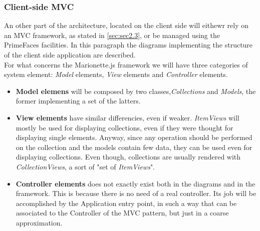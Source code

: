 \subsubsection{Client-side MVC}
An other part of the architecture, located on the client side will eithewr rely on an MVC framework, as stated in \autoref{sec:sec2.3}, or be managed using the PrimeFaces facilities.
In this paragraph the diagrams implementing the structure of the client side application are described.\\
For what concerns the Marionette.js framework we will have three categories of system element: \textit{Model} elements, \textit{View} elements and \textit{Controller} elements.
\begin{itemize}
\item \textbf{Model elemens} will be composed by two classes,\textit{Collections} and \textit{Models}, the former implementing a set of the latters.
\item \textbf{View elements} have similar differencies, even if weaker. \textit{ItemViews} will mostly be used for displaying collections, even if they were thought for displaying single elements. Anyway, since any operation should be performed on the collection and the models contain few data, they can be used even for displaying collections. Even though, collections are usually rendered with \textit{CollectionViews}, a sort of "set of \textit{ItemViews}".
\item \textbf{Controller elements} does not exactly exist both in the diagrams and in the framework. This is because there is no need of a real controller. Its job will be accomplished by the Application entry point, in such a way that can be associated to the Controller of the MVC pattern, but just in a coarse approximation.
\end{itemize}
   
